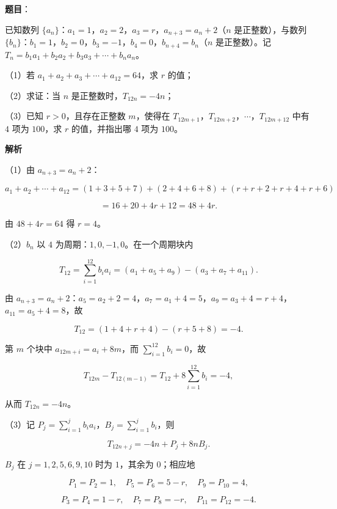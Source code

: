 \begin{answer}

\textbf{题目}：

已知数列 $\{a_n\}$：$a_1=1$，$a_2=2$，$a_3=r$，$a_{n+3}=a_n+2$（$n$ 是正整数），与数列 $\{b_n\}$：$b_1=1$，$b_2=0$，$b_3=-1$，$b_4=0$，$b_{n+4}=b_n$（$n$ 是正整数）。记 $T_n=b_1a_1+b_2a_2+b_3a_3+\cdots+b_na_n$。

（1）若 $a_1+a_2+a_3+\cdots+a_{12}=64$，求 $r$ 的值；

（2）求证：当 $n$ 是正整数时，$T_{12n}=-4n$；

（3）已知 $r>0$，且存在正整数 $m$，使得在 $T_{12m+1}$，$T_{12m+2}$，$\cdots$，$T_{12m+12}$ 中有 $4$ 项为 $100$，求 $r$ 的值，并指出哪 $4$ 项为 $100$。

\textbf{解析}

（1）由 $a_{n+3}=a_n+2$：

\nopagebreak[4]
\[a_1+a_2+\cdots+a_{12}=(1+3+5+7)+(2+4+6+8)+(r+r+2+r+4+r+6)\]

\nopagebreak[4]
\[=16+20+4r+12=48+4r.\]

由 $48+4r=64$ 得 $r=4$。

（2）$b_n$ 以 $4$ 为周期：$1,0,-1,0$。在一个周期块内

\nopagebreak[4]
\[T_{12}=\sum_{i=1}^{12}b_ia_i=(a_1+a_5+a_9)-(a_3+a_7+a_{11}).\]

由 $a_{n+3}=a_n+2$：$a_5=a_2+2=4$，$a_7=a_1+4=5$，$a_9=a_3+4=r+4$，$a_{11}=a_5+4=8$，故

\nopagebreak[4]
\[T_{12}=(1+4+r+4)-(r+5+8)=-4.\]

第 $m$ 个块中 $a_{12m+i}=a_i+8m$，而 $\sum\limits_{i=1}^{12}b_i=0$，故

\nopagebreak[4]
\[T_{12m}-T_{12(m-1)}=T_{12}+8\sum_{i=1}^{12}b_i=-4,\]

从而 $T_{12n}=-4n$。

（3）记 $P_j=\sum\limits_{i=1}^{j}b_ia_i$，$B_j=\sum\limits_{i=1}^{j}b_i$，则

\nopagebreak[4]
\[T_{12n+j}=-4n+P_j+8nB_j.\]

$B_j$ 在 $j=1,2,5,6,9,10$ 时为 $1$，其余为 $0$；相应地

\nopagebreak[4]
\[P_1=P_2=1,\quad P_5=P_6=5-r,\quad P_9=P_{10}=4,\]

\nopagebreak[4]
\[P_3=P_4=1-r,\quad P_7=P_8=-r,\quad P_{11}=P_{12}=-4.\]


\end{answer}

